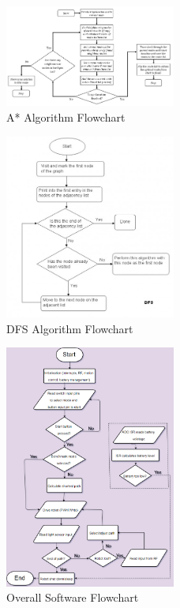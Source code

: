 \documentclass{article}
\begin{document}
\begin{figure}[!h]
\centerline{\includegraphics[width=0.5\textwidth]{a_star_diagram}}
\caption{A* Algorithm Flowchart}
\label{fig:astar}
\end{figure}

\begin{figure}[!h]
\centerline{\includegraphics[width=0.5\textwidth]{dfs_diagram}}
\caption{DFS Algorithm Flowchart}
\label{fig:dfs}
\end{figure}

\begin{figure}[!h]
\centerline{\includegraphics[width=0.5\textwidth]{software_flowchart}}
\caption{Overall Software Flowchart}
\label{fig:overallsoftchar}
\end{figure}
\end{document}
